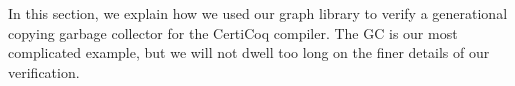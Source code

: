In this section, we explain how we used our graph library
to verify a generational copying garbage collector for the 
CertiCoq compiler. The GC is our most complicated example, 
but we will not dwell too long on the finer details of our
verification. 